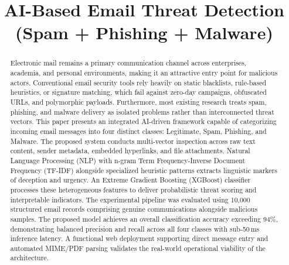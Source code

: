 \documentclass[conference]{IEEEtran}
\begin{document}
\title{AI-Based Email Threat Detection (Spam + Phishing + Malware)}

\author{
\and
{}
\and
{}
}

\maketitle

\begin{abstract}
Electronic mail remains a primary communication channel across enterprises, academia, and personal environments, making it an attractive entry point for malicious actors. Conventional email security tools rely heavily on static blacklists, rule-based heuristics, or signature matching, which fail against zero-day campaigns, obfuscated URLs, and polymorphic payloads. Furthermore, most existing research treats spam, phishing, and malware delivery as isolated problems rather than interconnected threat vectors. This paper presents an integrated AI-driven framework capable of categorizing incoming email messages into four distinct classes: Legitimate, Spam, Phishing, and Malware. The proposed system conducts multi-vector inspection across raw text content, sender metadata, embedded hyperlinks, and file attachments. Natural Language Processing (NLP) with n-gram Term Frequency-Inverse Document Frequency (TF-IDF) alongside specialized heuristic patterns extracts linguistic markers of deception and urgency. An Extreme Gradient Boosting (XGBoost) classifier processes these heterogeneous features to deliver probabilistic threat scoring and interpretable indicators. The experimental pipeline was evaluated using 10,000 structured email records comprising genuine communications alongside malicious samples. The proposed model achieves an overall classification accuracy exceeding 94\%, demonstrating balanced precision and recall across all four classes with sub-50\,ms inference latency. A functional web deployment supporting direct message entry and automated MIME/PDF parsing validates the real-world operational viability of the architecture.
\end{abstract}
\end{document}

